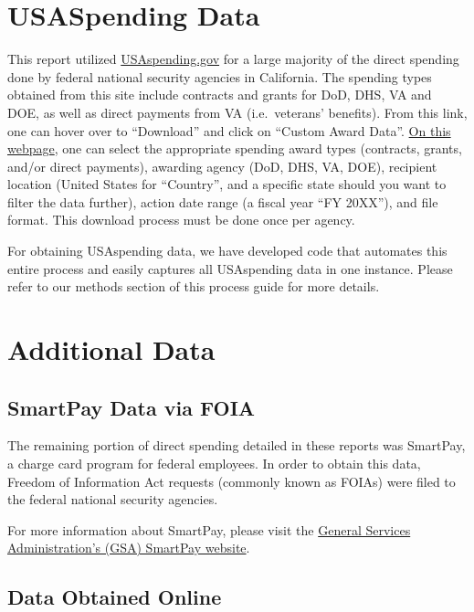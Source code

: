 \documentclass[
]{book}
\begin{document}
\hypertarget{usaspending-data}{%
\section{USASpending Data}\label{usaspending-data}}

This report utilized \href{https://www.usaspending.gov/}{USAspending.gov} for a large majority of the direct spending done by federal national security agencies in California. The spending types obtained from this site include contracts and grants for DoD, DHS, VA and DOE, as well as direct payments from VA (i.e.~veterans' benefits). From this link, one can hover over to ``Download'' and click on ``Custom Award Data''. \href{https://www.usaspending.gov/download_center/custom_award_data}{On this webpage}, one can select the appropriate spending award types (contracts, grants, and/or direct payments), awarding agency (DoD, DHS, VA, DOE), recipient location (United States for ``Country'', and a specific state should you want to filter the data further), action date range (a fiscal year ``FY 20XX''), and file format. This download process must be done once per agency.

For obtaining USAspending data, we have developed code that automates this entire process and easily captures all USAspending data in one instance. Please refer to our methods section of this process guide for more details.

\hypertarget{additional-data}{%
\section{Additional Data}\label{additional-data}}

\hypertarget{smartpay-data-via-foia}{%
\subsection{SmartPay Data via FOIA}\label{smartpay-data-via-foia}}

The remaining portion of direct spending detailed in these reports was SmartPay, a charge card program for federal employees. In order to obtain this data, Freedom of Information Act requests (commonly known as FOIAs) were filed to the federal national security agencies.

For more information about SmartPay, please visit the \href{https://www.gsa.gov/travel/plan-book/gsa-smartpay}{General Services Administration's (GSA) SmartPay website}.

\hypertarget{data-obtained-online}{%
\subsection{Data Obtained Online}\label{data-obtained-online}}
\end{document}
